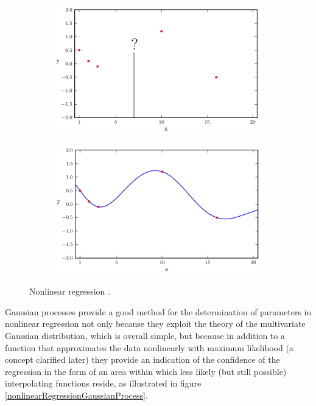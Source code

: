 \begin{oss}
\begin{figure}[h]
\centering
\begin{subfigure}{.5\textwidth}
  \centering
  \includegraphics[width=\linewidth]{images/Gaussian process/motivazione2.png}
\end{subfigure}%
\begin{subfigure}{.5\textwidth}
  \centering
  \includegraphics[width=\linewidth]{images/Gaussian process/motivazione3.png}
\end{subfigure}
\caption{Nonlinear regression \cite{turner_gaussian_2016}.}
\end{figure}


\newpage

Gaussian processes provide a good method for the determination of parameters in nonlinear regression not only because they exploit the theory of the multivariate Gaussian distribution, which is overall simple, but because in addition to a function that approximates the data nonlinearly with maximum likelihood (a concept clarified later) they provide an indication of the confidence of the regression in the form of an area within which less likely (but still possible) interpolating functions reside, as illustrated in figure \ref{nonlinearRegressionGaussianProcess}.



\end{oss}
